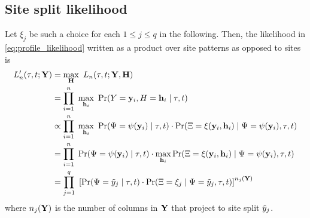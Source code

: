 \subsection*{Site split likelihood}

Let $\xi_j$ be such a choice for each $1 \leq j \leq q$ in the following.
Then, the likelihood in \eqref{eq:profile_likelihood} written as a product over site patterns as opposed to sites is
\begin{align}
L_\nCols'(\tau, t; \fullAlignment) &= \max_{\fullAncestralStates} \ L_\nCols(\tau, t; \fullAlignment, \fullAncestralStates) \nonumber \\
                             &= \prod_{i=1}^{\nCols} \ \max_{\ancestralStateColumn_i} \ \Pr(\alignmentColumnRV=\alignmentColumn_i, \ancestralStateColumnRV=\ancestralStateColumn_i \mid \tau, t) \nonumber \\
                             &\propto \prod_{i=1}^{\nCols} \ \max_{\ancestralStateColumn_i} \ \Pr(\siteSplitRV=\patternToSplit(\alignmentColumn_i) \mid \tau, t) \cdot \Pr(\ancestralSplitRV=\ancestralToSplit(\alignmentColumn_i, \ancestralStateColumn_i) \mid \siteSplitRV=\patternToSplit(\alignmentColumn_i), \tau, t) \nonumber \\
                             &= \prod_{i=1}^{\nCols} \ \Pr(\siteSplitRV=\patternToSplit(\alignmentColumn_i) \mid \tau, t) \cdot \max_{\ancestralStateColumn_i} \Pr(\ancestralSplitRV=\ancestralToSplit(\alignmentColumn_i, \ancestralStateColumn_i) \mid \siteSplitRV=\patternToSplit(\alignmentColumn_i), \tau, t) \nonumber \\
                             &= \prod_{j=1}^{\nSiteSplits} \ \left[\Pr(\siteSplitRV=\siteSplit_j \mid \tau, t)\cdot \Pr(\ancestralSplitRV=\xi_j \mid \siteSplitRV=\siteSplit_j, \tau, t)\right] ^{\nCols_j(\fullAlignment)} \label{eq:site_pattern_likelihood}
\end{align}
where $n_j(\mathbf{Y})$ is the number of columns in $\mathbf{Y}$ that project to site split $\tilde{y}_j$.

